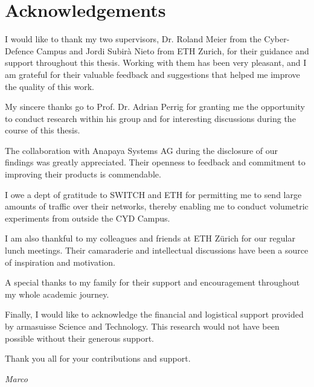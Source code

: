 \chapter*{Acknowledgements}


I would like to thank my two supervisors, Dr. Roland Meier from the Cyber-Defence Campus and Jordi Subirà Nieto from ETH Zurich, for their guidance and support throughout this thesis.
Working with them has been very pleasant, and I am grateful for their valuable feedback and suggestions that helped me improve the quality of this work.

My sincere thanks go to Prof. Dr. Adrian Perrig for granting me the opportunity to conduct research within his group and for interesting discussions during the course of this thesis.

The collaboration with Anapaya Systems AG during the disclosure of our findings was greatly appreciated.
Their openness to feedback and commitment to improving their products is commendable.

I owe a dept of gratitude to SWITCH and ETH for permitting me to send large amounts of traffic over their networks, thereby enabling me to conduct volumetric experiments from outside the CYD Campus.

I am also thankful to my colleagues and friends at ETH Zürich for our regular lunch meetings.
Their camaraderie and intellectual discussions have been a source of inspiration and motivation.

A special thanks to my family for their support and encouragement throughout my whole academic journey.

Finally, I would like to acknowledge the financial and logistical support provided by armasuisse Science and Technology.
This research would not have been possible without their generous support.

Thank you all for your contributions and support.

\begin{flushright}
\textit{Marco}
\end{flushright}
